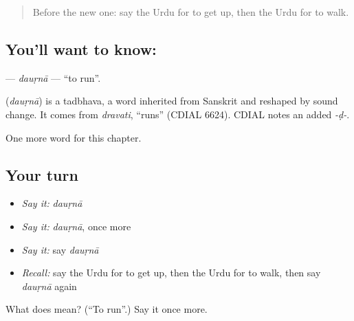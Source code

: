 \label{lesson:UR-C47-daurna}



\begin{quote}
Before the new one: say the Urdu for to get up, then the Urdu for to walk.
\end{quote}

\subsection*{You'll want to know: }
\textbf{} — \emph{dauṛnā} — \textquotedblleft{}to run\textquotedblright{}.

\begin{cousinweb}
\textbf{} (\emph{dauṛnā}) is a tadbhava, a word inherited from Sanskrit and reshaped by sound change. It comes from \emph{dravati}, \textquotedblleft{}runs\textquotedblright{} (CDIAL 6624). CDIAL notes an added \emph{-ḍ-}.
\end{cousinweb}

\begin{grammarlens}[title={What you've built}]
One more word for this chapter.
\end{grammarlens}

\subsection*{Your turn}
\begin{itemize}
\raggedright
  \item \emph{Say it:} \emph{dauṛnā}
  \item \emph{Say it:} \emph{dauṛnā}, once more
  \item \emph{Say it:} say \emph{dauṛnā}
  \item \emph{Recall:} say the Urdu for to get up, then the Urdu for to walk, then say \emph{dauṛnā} again
\end{itemize}

\begin{tcolorbox}[breakable,colback=teal!4,colframe=teal!35!black,title={Before you move on}]
What does  mean? (\textquotedblleft{}To run\textquotedblright{}.) Say it once more.
\end{tcolorbox}
